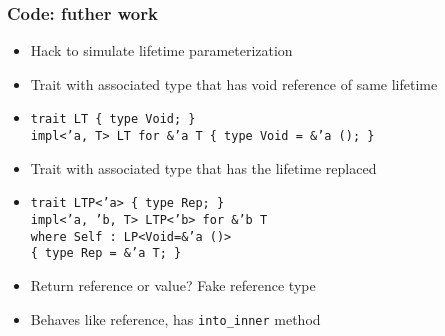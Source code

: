 \documentclass[xetex,mathserif,serif]{beamer}
\begin{document}
\begin{frame}
  \frametitle{Code: futher work}
  \begin{itemize}%
    \item Hack to simulate lifetime parameterization
    \item Trait with associated type that has void reference of same lifetime
    \item \texttt{trait LT \{ type Void; \}\\
      impl<'a, T> LT for \&'a T \{ type Void = \&'a (); \}}
    \item Trait with associated type that has the lifetime replaced
    \item \texttt{trait LTP<'a> \{ type Rep; \}\\
      impl<'a, 'b, T> LTP<'b> for \&'b T \\
      where Self : LP<Void=\&'a ()>\\
      \{ type Rep = \&'a T; \}}
    \item Return reference or value? Fake reference type
    \item Behaves like reference, has \texttt{into\_inner} method
  \end{itemize}
\end{frame}
\end{document}
